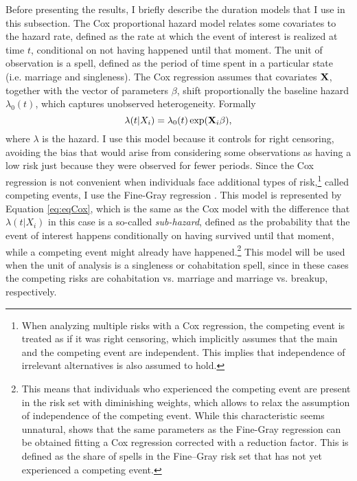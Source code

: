 \documentclass[12pt]{article}
\begin{document}
Before presenting the results, I briefly describe the duration models that I use in this subsection. The Cox proportional hazard model \citep{cox1972} relates some covariates to the hazard rate, defined as the rate at which the event of interest is realized at time $t$, conditional on not having happened until that moment. The unit of observation is a spell, defined as the period of time spent in a particular state (i.e. marriage and singleness). The Cox regression assumes that covariates $\bold{X}$, together with the vector of parameters $\beta$, shift proportionally the baseline hazard $\lambda_0(t)$, which captures unobserved heterogeneity. Formally
\begin{equation}\label{eq:eqCox}
\lambda(t|X_i)=\lambda_0(t) \exp(\bold{X}_i\beta),
\end{equation}
where $\lambda$ is the hazard. I use this model because it controls for right censoring, avoiding the bias that would arise from considering some observations as having a low risk just because they were observed for fewer periods. Since the Cox regression is not convenient when individuals face additional types of risk,\footnote{When analyzing multiple risks with a Cox regression, the competing event is treated as if it was right censoring, which implicitly assumes that the main and the competing event are independent. This implies that independence of irrelevant alternatives is also assumed to hold.} called competing events, I use the Fine-Gray regression \citep{fine1999}. This model is represented by Equation \ref{eq:eqCox}, which is the same as the Cox model with the difference that $\lambda(t|X_i)$ in this case is a so-called \textit{sub-hazard}, defined as the probability that the event of interest happens conditionally on having survived until that moment, while a competing event might already have happened.\footnote{This means that individuals who experienced the competing event are present in the risk set with diminishing weights, which allows to relax the assumption of independence of the competing event. While this characteristic seems unnatural, \cite{putter2020} shows that the same parameters as the Fine-Gray regression can be obtained fitting a Cox regression corrected with a reduction factor. This is defined as the share of spells in the Fine–Gray risk set that has not yet experienced a competing event.} This model will be used when the unit of analysis is a singleness or cohabitation spell, since in these cases the competing risks are cohabitation vs. marriage and marriage vs. breakup,  respectively.\\
\end{document}
